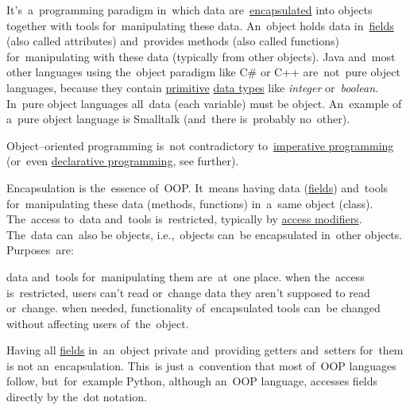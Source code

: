 
\label{objectorientedprogramming}
It's~a~programming paradigm in~which data are~\hyperref[encapsulation]{encapsulated} into objects together with tools for~manipulating these data.
An~object holds data in~\hyperref[variablefieldproperty]{fields} (also called attributes) and~provides methods (also called functions) for~manipulating with these data (typically from other objects).
Java and~most other languages using the~object paradigm like C\# or C++ are~not~pure object languages, because they contain \hyperref[javadatatypes]{primitive} \hyperref[datatypes]{data types} like \textit{integer} or~\textit{boolean}.
In~pure object languages all~data (each variable) must be object.
An~example of a~pure object language is Smalltalk (and~there is~probably no~other).

\warning Object--oriented programming is~not contradictory to~\hyperref[imperativeprogramming]{imperative programming} (or~even \hyperref[declarativeprogramming]{declarative programming}, see further).


\label{encapsulation}
Encapsulation is the~essence of~OOP.
It~means having data (\hyperref[variablefieldproperty]{fields}) and~tools for~manipulating these data (methods, functions) in~a~same object (class).
The~access to~data and~tools is~restricted, typically by \hyperref[javaaccessmodifiers]{access modifiers}.
The~data can~also be objects, i.e.,~objects can~be encapsulated in~other objects.
Purposes~are:
\begin{itemize}
     data and~tools for~manipulating them are~at~one place.
     when the~access is~restricted, users can't read or~change data they aren't supposed to read or~change.
     when needed, functionality of~encapsulated tools can~be changed without affecting users of~the~object.
\end{itemize}

\warning Having all \hyperref[variablefieldproperty]{fields} in~an~object private and~providing getters and~setters for~them is not an~encapsulation.
This~is just a~convention that most of~OOP languages follow, but~for~example Python, although an~OOP language, accesses fields directly by the~dot notation.

